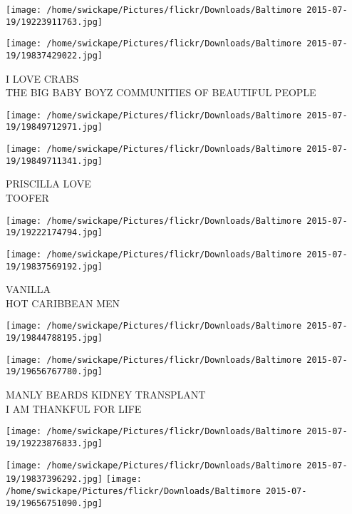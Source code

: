 \documentclass[10pt,letterpaper]{article}
\begin{document}
\texttt{[image: /home/swickape/Pictures/flickr/Downloads/Baltimore 2015-07-19/19223911763.jpg]}

\vspace{0.25in}
\texttt{[image: /home/swickape/Pictures/flickr/Downloads/Baltimore 2015-07-19/19837429022.jpg]}

I LOVE CRABS\\
THE BIG BABY BOYZ COMMUNITIES OF BEAUTIFUL PEOPLE\\
\pagebreak

\texttt{[image: /home/swickape/Pictures/flickr/Downloads/Baltimore 2015-07-19/19849712971.jpg]}

\vspace{0.25in}
\texttt{[image: /home/swickape/Pictures/flickr/Downloads/Baltimore 2015-07-19/19849711341.jpg]}

PRISCILLA LOVE\\
TOOFER\\
\pagebreak

\texttt{[image: /home/swickape/Pictures/flickr/Downloads/Baltimore 2015-07-19/19222174794.jpg]}

\vspace{0.25in}
\texttt{[image: /home/swickape/Pictures/flickr/Downloads/Baltimore 2015-07-19/19837569192.jpg]}

VANILLA\\
HOT CARIBBEAN MEN\\
\pagebreak

\texttt{[image: /home/swickape/Pictures/flickr/Downloads/Baltimore 2015-07-19/19844788195.jpg]}

\vspace{0.25in}
\texttt{[image: /home/swickape/Pictures/flickr/Downloads/Baltimore 2015-07-19/19656767780.jpg]}

MANLY BEARDS KIDNEY TRANSPLANT\\
I AM THANKFUL FOR LIFE\\
\pagebreak

\texttt{[image: /home/swickape/Pictures/flickr/Downloads/Baltimore 2015-07-19/19223876833.jpg]}

\vspace{0.25in}
\texttt{[image: /home/swickape/Pictures/flickr/Downloads/Baltimore 2015-07-19/19837396292.jpg]}
\texttt{[image: /home/swickape/Pictures/flickr/Downloads/Baltimore 2015-07-19/19656751090.jpg]}
\end{document}

